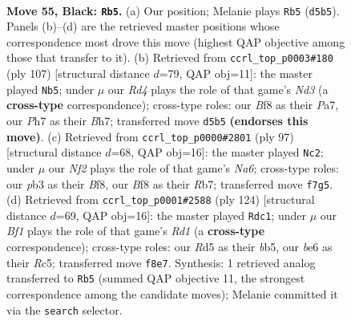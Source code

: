 \documentclass[11pt]{article}
\begin{document}
\clearpage

\begin{figure}[p]\centering
\begin{subfigure}{0.46\textwidth}\centering
\resizebox{\linewidth}{!}{%
\newchessgame
\chessboard[
  setfen={5b1r/p4nkp/P3B3/3r4/5B2/1Pp3KP/R1P3P1/R7 b - - 18 55},
  showmover=false,
  pgfstyle=straightmove, color=movearrow, markmove={d5-b5}
]}
\caption{}
\end{subfigure}\hfill
\begin{subfigure}{0.46\textwidth}\centering
\resizebox{\linewidth}{!}{%
\newchessgame
\chessboard[
  setfen={4r2k/p5pb/3n3p/8/3R3P/1BP4P/P3p2K/4B3 b - - 0 54},
  showmover=false,
  pgfstyle=straightmove, color=movearrow, markmove={d6-b5}
]}
\caption{}
\end{subfigure}
\\[4pt]
\begin{subfigure}{0.46\textwidth}\centering
\resizebox{\linewidth}{!}{%
\newchessgame
\chessboard[
  setfen={2r2bk1/1r6/6pp/8/3N1P2/np2P1PK/1B2R2P/5R2 b - - 1 49},
  showmover=false,
  pgfstyle=straightmove, color=movearrow, markmove={a3-c2}
]}
\caption{}
\end{subfigure}\hfill
\begin{subfigure}{0.46\textwidth}\centering
\resizebox{\linewidth}{!}{%
\newchessgame
\chessboard[
  setfen={8/2B3p1/p3rk1p/PbR1p3/4r3/7P/5PP1/3R2K1 w - - 58 63},
  showmover=false,
  pgfstyle=straightmove, color=movearrow, markmove={d1-c1}
]}
\caption{}
\end{subfigure}
\caption{\textbf{Move 55, Black: \texttt{Rb5}.} (a) Our position; Melanie plays \texttt{Rb5} (\texttt{d5b5}). Panels (b)--(d) are the retrieved master positions whose correspondence most drove this move (highest QAP objective among those that transfer to it). (b) Retrieved from \texttt{ccrl\_top\_p0003\#180} (ply 107) [structural distance $d$=79, QAP obj=11]: the master played \texttt{Nb5}; under $\mu$ our \emph{Rd4} plays the role of that game's \emph{Nd3} (a \textbf{cross-type} correspondence); cross-type roles: our \emph{B}f8 as their \emph{P}a7, our \emph{P}h7 as their \emph{B}h7; transferred move \texttt{d5b5} \textbf{(endorses this move)}. (c) Retrieved from \texttt{ccrl\_top\_p0000\#2801} (ply 97) [structural distance $d$=68, QAP obj=16]: the master played \texttt{Nc2}; under $\mu$ our \emph{Nf2} plays the role of that game's \emph{Na6}; cross-type roles: our \emph{p}b3 as their \emph{B}f8, our \emph{B}f8 as their \emph{R}b7; transferred move \texttt{f7g5}. (d) Retrieved from \texttt{ccrl\_top\_p0001\#2588} (ply 124) [structural distance $d$=69, QAP obj=16]: the master played \texttt{Rdc1}; under $\mu$ our \emph{Bf1} plays the role of that game's \emph{Rd1} (a \textbf{cross-type} correspondence); cross-type roles: our \emph{R}d5 as their \emph{b}b5, our \emph{b}e6 as their \emph{R}c5; transferred move \texttt{f8e7}. Synthesis: 1 retrieved analog transferred to \texttt{Rb5} (summed QAP objective 11, the strongest correspondence among the candidate moves); Melanie committed it via the \texttt{search} selector.}
\label{fig:thought-m109}
\end{figure}
\end{document}
